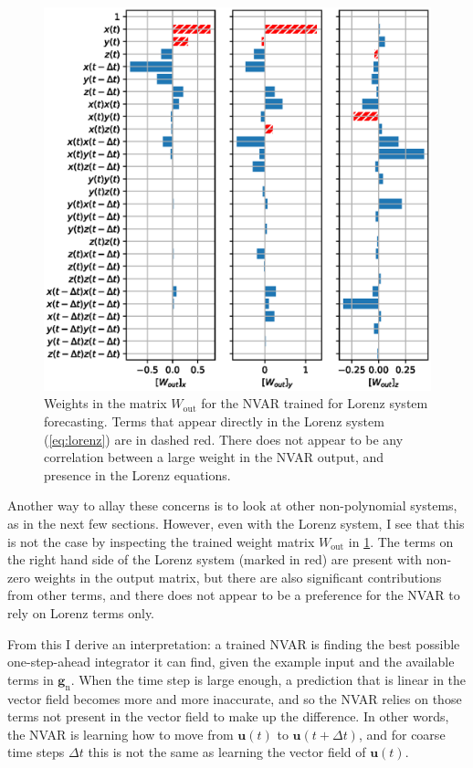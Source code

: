 \begin{figure}
  \includegraphics[width=\textwidth]{figures/nvar-predict-lorenz-wout}
  \caption{Weights in the matrix $W_\text{out}$ for the NVAR trained
    for Lorenz system forecasting. Terms that appear directly in the
    Lorenz system (\cref{eq:lorenz}) are in dashed red. There does not appear
    to be any correlation between a large weight in the NVAR output,
    and presence in the Lorenz equations.}
  \label{fig:nvar-predict-lorenz-wout}
\end{figure}

Another way to allay these concerns is to look at other non-polynomial
systems, as in the next few sections. However, even with the Lorenz
system, I see that this is not the case by inspecting the trained
weight matrix $W_\text{out}$ in
\cref{fig:nvar-predict-lorenz-wout}. The terms on the right hand side
of the Lorenz system (marked in red) are present with non-zero weights
in the output matrix, but there are also significant contributions
from other terms, and there does not appear to be a preference for the
NVAR to rely on Lorenz terms only.

From this I derive an interpretation: a trained NVAR is finding the
best possible one-step-ahead integrator it can find, given the example
input and the available terms in $\bm{g}_\text{n}$. When the time step
is large enough, a prediction that is linear in the vector field becomes more and more
inaccurate, and so the NVAR relies on those terms not present in the vector field
to make up the difference. In other words, the NVAR is learning how to move from $\bm{u}(t)$ to $\bm{u}(t + \Delta t)$, and for coarse time steps $\Delta t$ this is not the same as learning the vector field of $\bm{u}(t)$.

